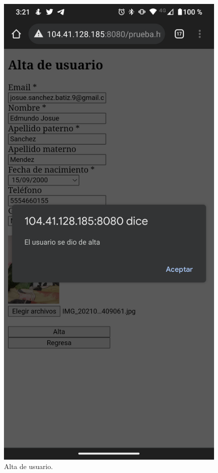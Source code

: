 \documentclass[11pt]{article}
\begin{document}
		\begin{figure}[H]
			\centering
			\includegraphics[scale=0.18]{resources/Screenshot_20211024-152129.png}
			\caption{Alta de usuario.}\label{fig:picture}
		\end{figure}
\end{document}
